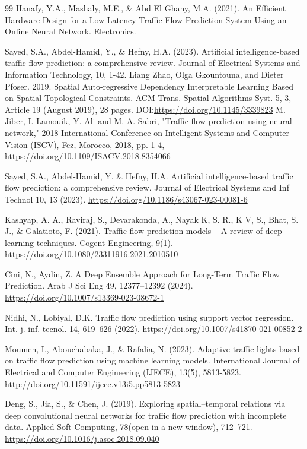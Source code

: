\documentclass[conference]{IEEEtran}
\begin{document}
\begin{thebibliography}{99}
 Hanafy, Y.A., Mashaly, M.E., \& Abd El Ghany, M.A. (2021). An Efficient Hardware Design for a Low-Latency Traffic Flow Prediction System Using an Online Neural Network. Electronics.

 Sayed, S.A., Abdel-Hamid, Y., \& Hefny, H.A. (2023). Artificial intelligence-based traffic flow prediction: a comprehensive review. Journal of Electrical Systems and Information Technology, 10, 1-42.
 Liang Zhao, Olga Gkountouna, and Dieter Pfoser. 2019. Spatial Auto-regressive Dependency Interpretable Learning Based on Spatial Topological Constraints. ACM Trans. Spatial Algorithms Syst. 5, 3, Article 19 (August 2019), 28 pages. DOI:\url{https://doi.org/10.1145/3339823}
 M. Jiber, I. Lamouik, Y. Ali and M. A. Sabri, "Traffic flow prediction using neural network," 2018 International Conference on Intelligent Systems and Computer Vision (ISCV), Fez, Morocco, 2018, pp. 1-4, \url{https://doi.org/10.1109/ISACV.2018.8354066}

 Sayed, S.A., Abdel-Hamid, Y. \& Hefny, H.A. Artificial intelligence-based traffic flow prediction: a comprehensive review. Journal of Electrical Systems and Inf Technol 10, 13 (2023). \url{https://doi.org/10.1186/s43067-023-00081-6}


 Kashyap, A. A., Raviraj, S., Devarakonda, A., Nayak K, S. R., K V, S., Bhat, S. J., \& Galatioto, F. (2021). Traffic flow prediction models – A review of deep learning techniques. Cogent Engineering, 9(1). 
 \url{https://doi.org/10.1080/23311916.2021.2010510}

 Cini, N., Aydin, Z. A Deep Ensemble Approach for Long-Term Traffic Flow Prediction. Arab J Sci Eng 49, 12377–12392 (2024). 
 \url{https://doi.org/10.1007/s13369-023-08672-1}

 Nidhi, N., Lobiyal, D.K. Traffic flow prediction using support vector regression. Int. j. inf. tecnol. 14, 619–626 (2022). 
 \url{https://doi.org/10.1007/s41870-021-00852-2}

 Moumen, I., Abouchabaka, J., \& Rafalia, N. (2023). Adaptive traffic lights based on traffic flow prediction using machine learning models. International Journal of Electrical and Computer Engineering (IJECE), 13(5), 5813-5823. \url{http://doi.org/10.11591/ijece.v13i5.pp5813-5823}

 Deng, S., Jia, S., \& Chen, J. (2019). Exploring spatial–temporal relations via deep convolutional neural networks for traffic flow prediction with incomplete data. Applied Soft Computing, 78(open in a new window), 712–721. 
 \url{https://doi.org/10.1016/j.asoc.2018.09.040}


\end{thebibliography}
\end{document}
